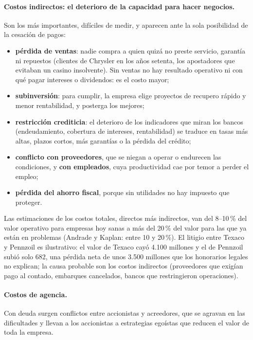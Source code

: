 \paragraph{Costos indirectos: el deterioro de la capacidad para hacer negocios.} Son los más importantes, difíciles de medir, y aparecen ante la sola posibilidad de la cesación de pagos:
\begin{itemize}
\item \textbf{pérdida de ventas}: nadie compra a quien quizá no preste servicio, garantía ni repuestos (clientes de Chrysler en los años setenta, los apostadores que evitaban un casino insolvente). Sin ventas no hay resultado operativo ni con qué pagar intereses o dividendos: es el costo mayor;
\item \textbf{subinversión}: para cumplir, la empresa elige proyectos de recupero rápido y menor rentabilidad, y posterga los mejores;
\item \textbf{restricción crediticia}: el deterioro de los indicadores que miran los bancos (endeudamiento, cobertura de intereses, rentabilidad) se traduce en tasas más altas, plazos cortos, más garantías o la pérdida del crédito;
\item \textbf{conflicto con proveedores}, que se niegan a operar o endurecen las condiciones, y \textbf{con empleados}, cuya productividad cae por temor a perder el empleo;
\item \textbf{pérdida del ahorro fiscal}, porque sin utilidades no hay impuesto que proteger.
\end{itemize}
Las estimaciones de los costos totales, directos más indirectos, van del 8--10\,\% del valor operativo para empresas hoy sanas a más del 20\,\% del valor para las que ya están en problemas (Andrade y Kaplan: entre 10 y 20\,\%). El litigio entre Texaco y Pennzoil es ilustrativo: el valor de Texaco cayó 4.100 millones y el de Pennzoil subió solo 682, una pérdida neta de unos 3.500 millones que los honorarios legales no explican; la causa probable son los costos indirectos (proveedores que exigían pago al contado, embarques cancelados, bancos que restringieron operaciones).

\paragraph{Costos de agencia.} Con deuda surgen conflictos entre accionistas y acreedores, que se agravan en las dificultades y llevan a los accionistas a estrategias egoístas que reducen el valor de toda la empresa.

